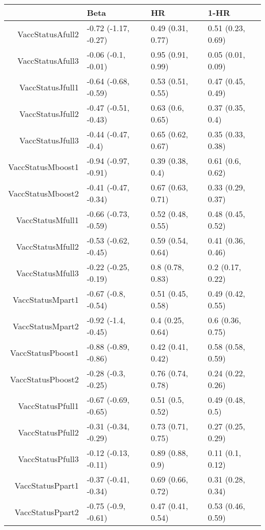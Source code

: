 \begin{table}[ht]
\centering
\begin{tabular}{rlll}
  \hline
 & Beta & HR & 1-HR \\ 
  \hline
VaccStatusAfull2 & -0.72 (-1.17, -0.27) & 0.49 (0.31, 0.77) & 0.51 (0.23, 0.69) \\ 
  VaccStatusAfull3 & -0.06 (-0.1, -0.01) & 0.95 (0.91, 0.99) & 0.05 (0.01, 0.09) \\ 
  VaccStatusJfull1 & -0.64 (-0.68, -0.59) & 0.53 (0.51, 0.55) & 0.47 (0.45, 0.49) \\ 
  VaccStatusJfull2 & -0.47 (-0.51, -0.43) & 0.63 (0.6, 0.65) & 0.37 (0.35, 0.4) \\ 
  VaccStatusJfull3 & -0.44 (-0.47, -0.4) & 0.65 (0.62, 0.67) & 0.35 (0.33, 0.38) \\ 
  VaccStatusMboost1 & -0.94 (-0.97, -0.91) & 0.39 (0.38, 0.4) & 0.61 (0.6, 0.62) \\ 
  VaccStatusMboost2 & -0.41 (-0.47, -0.34) & 0.67 (0.63, 0.71) & 0.33 (0.29, 0.37) \\ 
  VaccStatusMfull1 & -0.66 (-0.73, -0.59) & 0.52 (0.48, 0.55) & 0.48 (0.45, 0.52) \\ 
  VaccStatusMfull2 & -0.53 (-0.62, -0.45) & 0.59 (0.54, 0.64) & 0.41 (0.36, 0.46) \\ 
  VaccStatusMfull3 & -0.22 (-0.25, -0.19) & 0.8 (0.78, 0.83) & 0.2 (0.17, 0.22) \\ 
  VaccStatusMpart1 & -0.67 (-0.8, -0.54) & 0.51 (0.45, 0.58) & 0.49 (0.42, 0.55) \\ 
  VaccStatusMpart2 & -0.92 (-1.4, -0.45) & 0.4 (0.25, 0.64) & 0.6 (0.36, 0.75) \\ 
  VaccStatusPboost1 & -0.88 (-0.89, -0.86) & 0.42 (0.41, 0.42) & 0.58 (0.58, 0.59) \\ 
  VaccStatusPboost2 & -0.28 (-0.3, -0.25) & 0.76 (0.74, 0.78) & 0.24 (0.22, 0.26) \\ 
  VaccStatusPfull1 & -0.67 (-0.69, -0.65) & 0.51 (0.5, 0.52) & 0.49 (0.48, 0.5) \\ 
  VaccStatusPfull2 & -0.31 (-0.34, -0.29) & 0.73 (0.71, 0.75) & 0.27 (0.25, 0.29) \\ 
  VaccStatusPfull3 & -0.12 (-0.13, -0.11) & 0.89 (0.88, 0.9) & 0.11 (0.1, 0.12) \\ 
  VaccStatusPpart1 & -0.37 (-0.41, -0.34) & 0.69 (0.66, 0.72) & 0.31 (0.28, 0.34) \\ 
  VaccStatusPpart2 & -0.75 (-0.9, -0.61) & 0.47 (0.41, 0.54) & 0.53 (0.46, 0.59) \\ 

\end{tabular}
\end{table}
